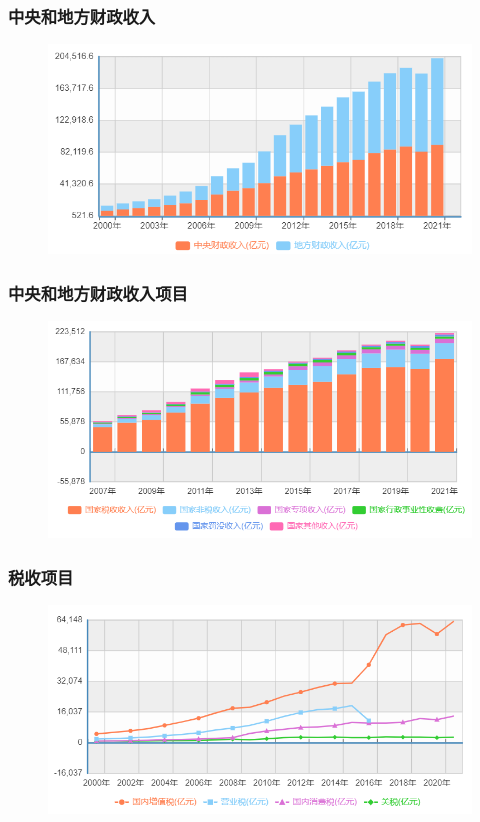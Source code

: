 \documentclass[aspectratio=169, 12pt]{beamer}
\begin{document}
\begin{frame}[plain]
    \frametitle{中央和地方财政收入}
    \begin{figure}
        \centering
        \includegraphics[width=1.0\textwidth]{./resources/figure/income.png}
    \end{figure}
\end{frame}

\begin{frame}[plain]
    \frametitle{中央和地方财政收入项目}
    \begin{figure}
        \centering
        \includegraphics[width=1.0\textwidth]{./resources/figure/incomeratio.png}
    \end{figure}
\end{frame}

\begin{frame}[plain]
    \frametitle{税收项目}
    \begin{figure}
        \centering
        \includegraphics[width=1.0\textwidth]{./resources/figure/tax.png}
    \end{figure}
\end{frame}
\end{document}
